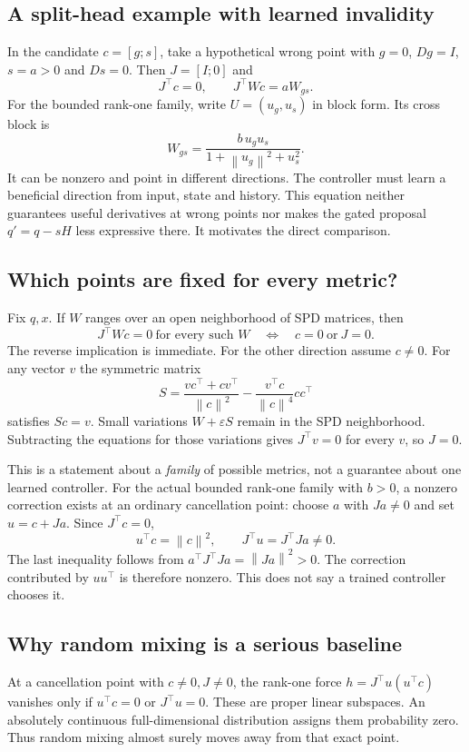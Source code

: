 \documentclass[11pt,a4paper]{article}
\newcommand{\norm}[1]{\left\lVert #1\right\rVert}
\begin{document}
\subsection{A split-head example with learned invalidity}
In the candidate $c=[g;s]$, take a hypothetical wrong point with $g=0$, $Dg=I$, $s=a>0$ and $Ds=0$. Then $J=[I;0]$ and
\[
J^\top c=0,\qquad J^\top Wc=a W_{gs}.
\]
For the bounded rank-one family, write $U=(u_g,u_s)$ in block form. Its cross block is
\[
W_{gs}=\frac{b\,u_g u_s}{1+\norm{u_g}^2+u_s^2}.
\]
It can be nonzero and point in different directions. The controller must learn a beneficial direction from input, state and history. This equation neither guarantees useful derivatives at wrong points nor makes the gated proposal $q'=q-sH$ less expressive there. It motivates the direct comparison.

\subsection{Which points are fixed for every metric?}
Fix $q,x$. If $W$ ranges over an open neighborhood of SPD matrices, then
\[
J^\top Wc=0\ \text{for every such }W
\quad\Longleftrightarrow\quad c=0\ \text{or}\ J=0.
\]
The reverse implication is immediate. For the other direction assume $c\ne0$. For any vector $v$ the symmetric matrix
\[
S=\frac{vc^\top+cv^\top}{\norm{c}^2}
-\frac{v^\top c}{\norm{c}^4}cc^\top
\]
satisfies $Sc=v$. Small variations $W+\varepsilon S$ remain in the SPD neighborhood. Subtracting the equations for those variations gives $J^\top v=0$ for every $v$, so $J=0$.

This is a statement about a \emph{family} of possible metrics, not a guarantee about one learned controller. For the actual bounded rank-one family with $b>0$, a nonzero correction exists at an ordinary cancellation point: choose $a$ with $Ja\ne0$ and set $u=c+Ja$. Since $J^\top c=0$,
\[
u^\top c=\norm{c}^2,\qquad J^\top u=J^\top Ja\ne0.
\]
The last inequality follows from $a^\top J^\top Ja=\norm{Ja}^2>0$. The correction contributed by $uu^\top$ is therefore nonzero. This does not say a trained controller chooses it.

\subsection{Why random mixing is a serious baseline}\label{app:random}
At a cancellation point with $c\ne0,J\ne0$, the rank-one force $h=J^\top u(u^\top c)$ vanishes only if $u^\top c=0$ or $J^\top u=0$. These are proper linear subspaces. An absolutely continuous full-dimensional distribution assigns them probability zero. Thus random mixing almost surely moves away from that exact point.
\end{document}
